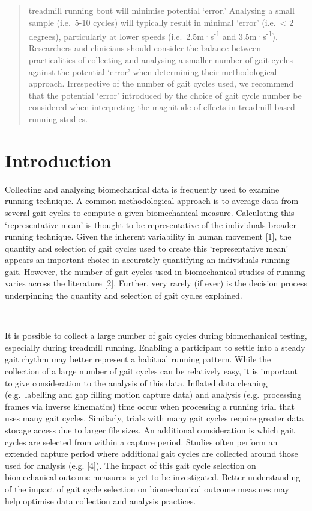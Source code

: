 \documentclass[]{elsarticle} %
\begin{document}
\begin{frontmatter}
\begin{abstract}
  treadmill running bout will minimise potential `error.' Analysing a
  small sample (i.e.~5-10 cycles) will typically result in minimal
  `error' (i.e.~\textless{} 2 degrees), particularly at lower speeds
  (i.e.~2.5m·s\textsuperscript{-1} and 3.5m·s\textsuperscript{-1}).
  Researchers and clinicians should consider the balance between
  practicalities of collecting and analysing a smaller number of gait
  cycles against the potential `error' when determining their
  methodological approach. Irrespective of the number of gait cycles
  used, we recommend that the potential `error' introduced by the choice
  of gait cycle number be considered when interpreting the magnitude of
  effects in treadmill-based running studies.
  \end{abstract}
  
 \end{frontmatter}

\hypertarget{introduction}{%
\section{Introduction}\label{introduction}}

Collecting and analysing biomechanical data is frequently used to
examine running technique. A common methodological approach is to
average data from several gait cycles to compute a given biomechanical
measure. Calculating this `representative mean' is thought to be
representative of the individuals broader running technique. Given the
inherent variability in human movement {[}1{]}, the quantity and
selection of gait cycles used to create this `representative mean'
appears an important choice in accurately quantifying an individuals
running gait. However, the number of gait cycles used in biomechanical
studies of running varies across the literature {[}2{]}. Further, very
rarely (if ever) is the decision process underpinning the quantity and
selection of gait cycles explained.

~

It is possible to collect a large number of gait cycles during
biomechanical testing, especially during treadmill running. Enabling a
participant to settle into a steady gait rhythm may better represent a
habitual running pattern. While the collection of a large number of gait
cycles can be relatively easy, it is important to give consideration to
the analysis of this data. Inflated data cleaning (e.g.~labelling and
gap filling motion capture data) and analysis (e.g.~processing frames
via inverse kinematics) time occur when processing a running trial that
uses many gait cycles. Similarly, trials with many gait cycles require
greater data storage access due to larger file sizes. An additional
consideration is which gait cycles are selected from within a capture
period. Studies often perform an extended capture period where
additional gait cycles are collected around those used for analysis
(e.g. {[}4{]}). The impact of this gait cycle selection on biomechanical
outcome measures is yet to be investigated. Better understanding of the
impact of gait cycle selection on biomechanical outcome measures may
help optimise data collection and analysis practices.
\end{document}
